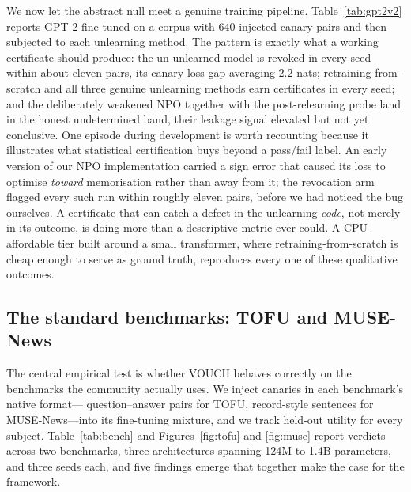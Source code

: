 We now let the abstract null meet a genuine training pipeline. Table~\ref{tab:gpt2v2}
reports GPT-2 fine-tuned on a corpus with $640$ injected canary pairs and then
subjected to each unlearning method. The pattern is exactly what a working certificate
should produce: the un-unlearned model is revoked in every seed within about eleven
pairs, its canary loss gap averaging $2.2$ nats; retraining-from-scratch and all three
genuine unlearning methods earn certificates in every seed; and the deliberately
weakened NPO together with the post-relearning probe land in the honest undetermined
band, their leakage signal elevated but not yet conclusive. One episode during
development is worth recounting because it illustrates what statistical certification
buys beyond a pass/fail label. An early version of our NPO implementation carried a
sign error that caused its loss to optimise \emph{toward} memorisation rather than away
from it; the revocation arm flagged every such run within roughly eleven pairs, before
we had noticed the bug ourselves. A certificate that can catch a defect in the
unlearning \emph{code}, not merely in its outcome, is doing more than a descriptive
metric ever could. A CPU-affordable tier built around a small transformer, where
retraining-from-scratch is cheap enough to serve as ground truth, reproduces every one
of these qualitative outcomes.

\begin{table}[t]
\centering\small
\caption{GPT-2 end-to-end over 3 seeds ($640$ pairs, two-sided $\eps=0.2$): per-seed
verdicts (\vI\ issued, \vR\ revoked, \vU\ undetermined), the mean confidence-sequence
upper bound on $\Delta$, and the mean canary loss gap $\bar D$.}
\label{tab:gpt2v2}

\end{table}

\subsection{The standard benchmarks: TOFU and MUSE-News}\label{sec:exp-bench}

The central empirical test is whether VOUCH behaves correctly on the benchmarks the
community actually uses. We inject canaries in each benchmark's native format---
question--answer pairs for TOFU, record-style sentences for MUSE-News---into its
fine-tuning mixture, and we track held-out utility for every subject.
Table~\ref{tab:bench} and Figures~\ref{fig:tofu} and \ref{fig:muse} report verdicts
across two benchmarks, three architectures spanning 124M to 1.4B parameters, and
three seeds each, and five findings emerge
that together make the case for the framework.

